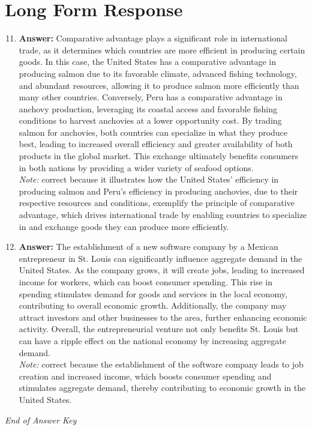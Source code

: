 \documentclass[12pt]{article}
\begin{document}
\section*{Long Form Response}
\begin{enumerate}[label=\arabic*.]
\setcounter{enumi}{10}
\item \textbf{Answer:} Comparative advantage plays a significant role in international trade, as it determines which countries are more efficient in producing certain goods. In this case, the United States has a comparative advantage in producing salmon due to its favorable climate, advanced fishing technology, and abundant resources, allowing it to produce salmon more efficiently than many other countries. Conversely, Peru has a comparative advantage in anchovy production, leveraging its coastal access and favorable fishing conditions to harvest anchovies at a lower opportunity cost. By trading salmon for anchovies, both countries can specialize in what they produce best, leading to increased overall efficiency and greater availability of both products in the global market. This exchange ultimately benefits consumers in both nations by providing a wider variety of seafood options.
\\ \textit{Note:} correct because it illustrates how the United States' efficiency in producing salmon and Peru's efficiency in producing anchovies, due to their respective resources and conditions, exemplify the principle of comparative advantage, which drives international trade by enabling countries to specialize in and exchange goods they can produce more efficiently.
\item \textbf{Answer:} The establishment of a new software company by a Mexican entrepreneur in St. Louis can significantly influence aggregate demand in the United States. As the company grows, it will create jobs, leading to increased income for workers, which can boost consumer spending. This rise in spending stimulates demand for goods and services in the local economy, contributing to overall economic growth. Additionally, the company may attract investors and other businesses to the area, further enhancing economic activity. Overall, the entrepreneurial venture not only benefits St. Louis but can have a ripple effect on the national economy by increasing aggregate demand.
\\ \textit{Note:} correct because the establishment of the software company leads to job creation and increased income, which boosts consumer spending and stimulates aggregate demand, thereby contributing to economic growth in the United States.
\end{enumerate}

\vfill
\noindent\textit{End of Answer Key}
\end{document}
